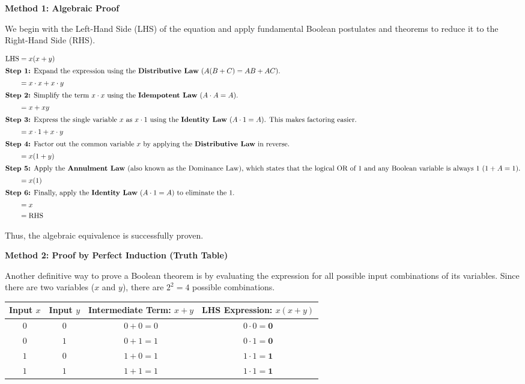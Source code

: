 \documentclass[12pt,a3paper]{article}
\begin{document}
\begin{enumerate}
\begin{tcolorbox}[enhanced,breakable,ansbox,colback=cA!4,colframe=cA,boxrule=0.8pt,arc=5pt,title={\textbf{Answer}},fonttitle=\bfseries\color{white},colbacktitle=cA]
\vspace{0.4cm}
\textbf{Method 1: Algebraic Proof}

We begin with the Left-Hand Side (LHS) of the equation and apply fundamental Boolean postulates and theorems to reduce it to the Right-Hand Side (RHS).

\begin{align*}
\text{LHS} &= x(x + y) \\
\intertext{\textbf{Step 1:} Expand the expression using the \textbf{Distributive Law} ($A(B + C) = AB + AC$).}
&= x \cdot x + x \cdot y \\
\intertext{\textbf{Step 2:} Simplify the term $x \cdot x$ using the \textbf{Idempotent Law} ($A \cdot A = A$).}
&= x + xy \\
\intertext{\textbf{Step 3:} Express the single variable $x$ as $x \cdot 1$ using the \textbf{Identity Law} ($A \cdot 1 = A$). This makes factoring easier.}
&= x \cdot 1 + x \cdot y \\
\intertext{\textbf{Step 4:} Factor out the common variable $x$ by applying the \textbf{Distributive Law} in reverse.}
&= x(1 + y) \\
\intertext{\textbf{Step 5:} Apply the \textbf{Annulment Law} (also known as the Dominance Law), which states that the logical OR of $1$ and any Boolean variable is always $1$ ($1 + A = 1$).}
&= x(1) \\
\intertext{\textbf{Step 6:} Finally, apply the \textbf{Identity Law} ($A \cdot 1 = A$) to eliminate the $1$.}
&= x \\
&= \text{RHS}
\end{align*}

Thus, the algebraic equivalence is successfully proven.

\vspace{0.4cm}
\textbf{Method 2: Proof by Perfect Induction (Truth Table)}

Another definitive way to prove a Boolean theorem is by evaluating the expression for all possible input combinations of its variables. Since there are two variables ($x$ and $y$), there are $2^2 = 4$ possible combinations.

\begin{center}
\renewcommand{\arraystretch}{1.3}
\begin{tabular}{|c|c||c|c|}
\hline
\textbf{Input $x$} & \textbf{Input $y$} & \textbf{Intermediate Term: $x + y$} & \textbf{LHS Expression: $x(x + y)$} \\
\hline
$0$ & $0$ & $0 + 0 = 0$ & $0 \cdot 0 = \mathbf{0}$ \\
\hline
$0$ & $1$ & $0 + 1 = 1$ & $0 \cdot 1 = \mathbf{0}$ \\
\hline
$1$ & $0$ & $1 + 0 = 1$ & $1 \cdot 1 = \mathbf{1}$ \\
\hline
$1$ & $1$ & $1 + 1 = 1$ & $1 \cdot 1 = \mathbf{1}$ \\
\hline
\end{tabular}
\end{center}


\end{tcolorbox}
\end{enumerate}
\end{document}

